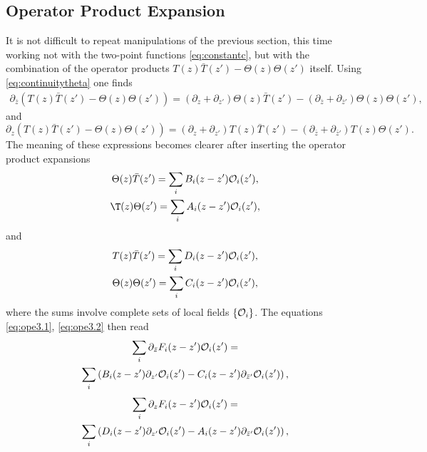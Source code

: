   \subsection{Operator Product Expansion}
  It is not difficult to repeat manipulations of the previous section, this time
  working not with the two-point functions \eqref{eq:constantc}, but with
  the combination of the operator products $T(z)\bar{T}(z')
  - \Theta(z)\Theta(z')$ itself. Using \eqref{eq:continuitytheta} one finds
  \begin{multline}
    \partial_{\bar{z}}\left(T(z)\bar{T}(z')-\Theta(z)\Theta(z')\right)
    =
    (\partial_z + \partial_{z'})\Theta(z)\bar{T}(z')
    - (\partial_{\bar{z}}+\partial_{\bar{z}'})\Theta(z)\Theta(z'),
    \label{eq:ope3.1}
  \end{multline}
  and
  \begin{equation}
    \partial_z(T(z)\bar{T}(z') - \Theta(z)\Theta(z')) = 
    (\partial_z + \partial_{z'})T(z)\bar{T}(z') - (\partial_{\bar{z}}
    + \partial_{\bar{z}'})T(z)\Theta(z').
    \label{eq:ope3.2}
  \end{equation}
  The meaning of these expressions becomes clearer after inserting the operator
  product expansions
  \begin{gather}
    \Theta(z)\bar{T}(z') = \sum_i B_i(z-z')\cfto_i(z'),\\
    \T(z)\Theta(z') = \sum_i A_i(z-z')\cfto_i(z'),
  \end{gather}
  and
  \begin{gather}
    T(z)\bar{T}(z') = \sum_i D_i(z-z')\mathcal{O}_i(z'),\\
    \Theta(z)\Theta(z') = \sum_i C_i(z-z')\mathcal{O}_i(z'),
    \label{eq:opetheta15}
  \end{gather}
  where the sums involve complete sets of local fields
  $\left\{\mathcal{O}_i\right\}$. The equations \eqref{eq:ope3.1}, \eqref{eq:ope3.2} then
  read 
  \begin{gather}
    \sum_i \partial_{\bar{z}} F_i (z-z')\mathcal{O}_i(z') =\nonumber\\
    \sum_i\left(B_i(z-z')\partial_{z'}\mathcal{O}_i(z')
    - C_i(z-z')\partial_{\bar{z}'}\mathcal{O}_i(z')\right),
    \label{eq:ope3.1final}
  \end{gather}
  \begin{gather}
    \sum_i\partial_z F_i(z-z')\mathcal{O}_i(z') = \nonumber\\
    \sum_i\left(D_i(z-z')\partial_{z'}\mathcal{O}_i(z')
    - A_i(z-z')\partial_{\bar{z}'}\mathcal{O}_i(z')\right),
    \label{eq:ope3.2final}
  \end{gather}
